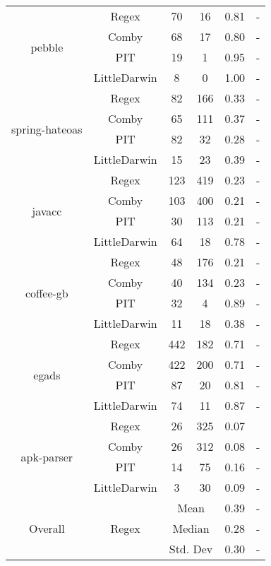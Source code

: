 \documentclass[sigconf,review, anonymous]{acmart}
\begin{document}
{\begin{table}[htbp]
{\begin{tabular}{|c|c|c|c|c|c|}
 \multirow{4}{*}{\small pebble} & Regex & 70 & 16 & 0.81 & - \\\cline{2-6}
    & Comby & 68 & 17 & 0.80 & - \\\cline{2-6}
    & PIT & 19 & 1 & 0.95 & - \\ \cline{2-6}
    & LittleDarwin & 8 & 0 & 1.00 & - \\ \hline
\multirow{4}{*}{\small spring-hateoas} & Regex & 82 & 166 & 0.33 & - \\\cline{2-6}
    & Comby & 65 & 111 & 0.37 & - \\ \cline{2-6}
    & PIT & 82 & 32 & 0.28 & - \\ \cline{2-6}
    & LittleDarwin & 15 & 23 & 0.39 & - \\ \hline
\multirow{4}{*}{\small javacc} & Regex & 123 & 419 & 0.23 & - \\\cline{2-6}
    & Comby & 103 & 400 & 0.21 & - \\ \cline{2-6}
    & PIT & 30 & 113 & 0.21 & -\\ \cline{2-6}
    & LittleDarwin & 64 & 18 & 0.78 & - \\ \hline
\multirow{4}{*}{\small coffee-gb} & Regex & 48 & 176 & 0.21 & - \\\cline{2-6}
    & Comby & 40 & 134 & 0.23 & - \\ \cline{2-6}
    & PIT & 32 & 4 & 0.89 & - \\ \cline{2-6}
    & LittleDarwin & 11 & 18 & 0.38 & -\\ \hline
\multirow{4}{*}{\small egads} & Regex & 442 & 182 & 0.71 & - \\\cline{2-6}
    & Comby & 422 & 200 & 0.71 & - \\ \cline{2-6}
    & PIT & 87 & 20 & 0.81 & - \\ \cline{2-6}
    & LittleDarwin & 74 & 11 & 0.87 & - \\ \hline
\multirow{4}{*}{\small apk-parser} & Regex & 26 & 325 & 0.07 & \\\cline{2-6}
    & Comby & 26 & 312 & 0.08 & -\\ \cline{2-6}
    & PIT & 14 & 75  & 0.16 & -\\ \cline{2-6}
    & LittleDarwin & 3 & 30 & 0.09 & -\\ \hline
    
\multirow{12}{*}{Overall} & \multirow{3}{*}{Regex} & \multicolumn{2}{c|}{Mean} & 0.39  & -\\\cline{3-6}
    &   &  \multicolumn{2}{c|}{Median} & 0.28 & - \\\cline{3-6}
    &   &  \multicolumn{2}{c|}{Std. Dev} & 0.30 & - \\\cline{2-6}


\end{tabular}}
\end{table}}
\end{document}
